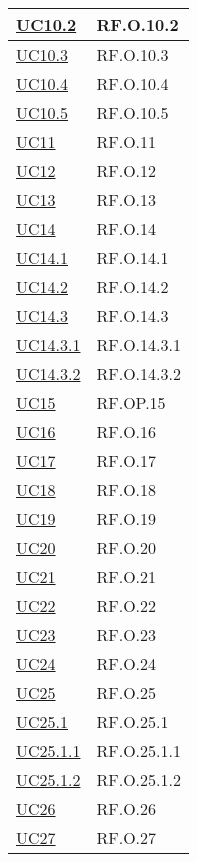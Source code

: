 \begin{longtable}{|P{4,5cm}|>{\arraybackslash}P{9cm}|}
  \hline
  \hyperref[UC10point2]{UC10.2} & RF.O.10.2\\
  \hline
  \hyperref[UC10point3]{UC10.3} & RF.O.10.3\\
  \hline
  \hyperref[UC10point4]{UC10.4} & RF.O.10.4\\
  \hline
  \hyperref[UC10point5]{UC10.5} & RF.O.10.5\\
  \hline
  \hyperref[UC11]{UC11} & RF.O.11 \\
  \hline
  \hyperref[UC12]{UC12} & RF.O.12 \\
  \hline
  \hyperref[UC13]{UC13} & RF.O.13 \\
  \hline
  \hyperref[UC14]{UC14} & RF.O.14 \\
  \hline
  \hyperref[UC14point1]{UC14.1} & RF.O.14.1 \\
  \hline
  \hyperref[UC14point2]{UC14.2} & RF.O.14.2 \\
  \hline
  \hyperref[UC14point3]{UC14.3} & RF.O.14.3 \\
  \hline
  \hyperref[UC14point3point1]{UC14.3.1} & RF.O.14.3.1 \\
  \hline
  \hyperref[UC14point3point2]{UC14.3.2} & RF.O.14.3.2 \\
  \hline
  \hyperref[UC15]{UC15} & RF.OP.15 \\
  \hline
  \hyperref[UC16]{UC16} & RF.O.16 \\
  \hline
  \hyperref[UC17]{UC17} & RF.O.17 \\
  \hline
  \hyperref[UC18]{UC18} & RF.O.18 \\
  \hline
  \hyperref[UC19]{UC19} & RF.O.19 \\
  \hline
  \hyperref[UC20]{UC20} & RF.O.20 \\
  \hline
  \hyperref[UC21]{UC21} & RF.O.21 \\
  \hline
  \hyperref[UC22]{UC22} & RF.O.22 \\
  \hline
  \hyperref[UC23]{UC23} & RF.O.23 \\
  \hline
  \hyperref[UC24]{UC24} & RF.O.24 \\
  \hline
  \hyperref[UC25]{UC25} & RF.O.25 \\
  \hline
  \hyperref[UC25point1]{UC25.1} & RF.O.25.1 \\
  \hline
  \hyperref[UC25point1point1]{UC25.1.1} & RF.O.25.1.1 \\
  \hline
  \hyperref[UC25poin1point2]{UC25.1.2} & RF.O.25.1.2 \\
  \hline
  \hyperref[UC26]{UC26} & RF.O.26 \\
  \hline
  \hyperref[UC27]{UC27} & RF.O.27 \\

\end{longtable}

